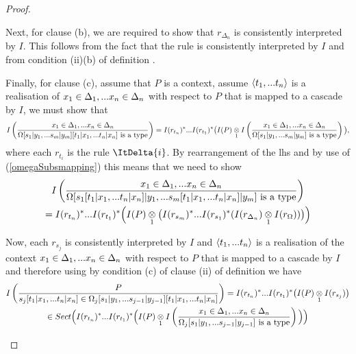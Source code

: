 \begin{proof}
\begin{enumerate}[(i)]
Next, for clause (b), we are required to show that $r_{\Delta_n}$ is consistently interpreted by $I$. 
This follows from the fact that 
the rule   is consistently interpreted by $I$ 
and from condition (ii)(b) of definition .

Finally, for clause (c), assume that $P$ is a context,
assume $\tuple{\tn}$ is a realisation of $\xDelta{n}$ with respect to $P$ that is mapped to a cascade by $I$, 
we must show that
$$\Imappedrule{\xDelta{n}}{\isT{\Omega[\SUBsFORy{m}][\SUBtFORx{n}]}}
                =I(r_{t_n})^* ... I(r_{t_1})^*\big(\crossx{I(P)}{\Imappedrule{\xDelta{n}}{\isT{\Omega[\SUBsFORy{m}]}}}{1}\big),$$
where each $r_{t_i}$ is the rule $\ItDelta{i}$.
By rearrangement of the lhs and by use of (\ref{omegaSubsmapping}) this means that we need to show 
\begin{multline}
\label{ctarget}
\Imappedrule{\xDelta{n}}{\isT{\Omega[s_1[\SUBtFORx{n}]|y_1,... s_m[\SUBtFORx{n}]|y_m]}} \\
            =I(r_{t_n})^* ... I(r_{t_1})^*\Big(\crossx{I(P)}{ \big( I(r_{s_m})^*...I(r_{s_1})^*(\crossx{I(r_{\Delta_n})}{I(r_\Omega)}{1}) \big) }{1}\Big)
\end{multline}

\newcommand{\IOmegaDoublySubstituted}[1]{\Omega_#1[\SUBsFORy{#1-1}][\SUBtFORx{n}]}
Now, each $r_{s_j}$ is consistently interpreted by $I$ and $\tuple{\tn}$ is a realisation
of the context $\xDelta{n}$ with respect to $P$ that is mapped to a cascade by $I$ and therefore using 
by condition (c) of clause (ii) of definition  we have 
\begin{multline*}
\Imappedrule{P}{\ofT{s_j[\SUBtFORx{n}]}{\IOmegaDoublySubstituted{j}}}
           = I(r_{t_n})^* ... I(r_{t_1})^*\big(\crossx{I(P)}{I(r_{s_j})} {1}\big) \\
           \in Sect\Big(I(r_{t_n})^* ... I(r_{t_1})^*\Big(\crossx{I(P)}{\Imappedrule{\xDelta{n}}{\isT{\Omega_j[\SUBsFORy{j-1}]}}} {1}\Big)\Big)
\end{multline*}


\end{enumerate}
\end{proof}

